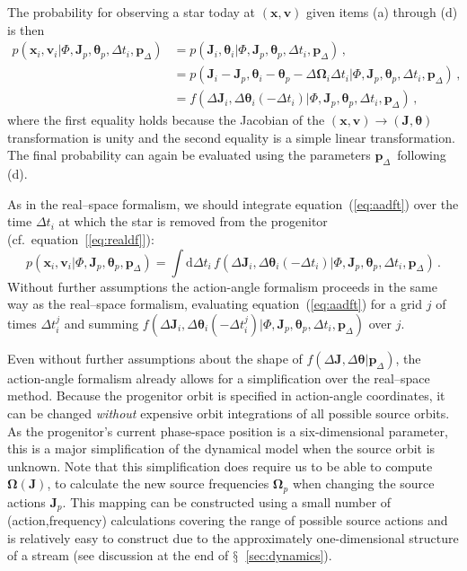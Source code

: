 \documentclass[12pt,preprint]{aastex}
\newcommand{\dd}{\mathrm{d}}
\newcommand{\eqnname}{equation}
\newcommand{\sectionname}{$\mathsection$}
\renewcommand{\vec}[1]{\ensuremath{\mathbf{#1}}}
\newcommand{\vecx}{\ensuremath{\vec{x}}}
\newcommand{\vecv}{\ensuremath{\vec{v}}}
\newcommand{\vecj}{\ensuremath{\vec{J}}}
\newcommand{\veco}{\ensuremath{\vec{\Omega}}}
\newcommand{\veca}{\ensuremath{\boldsymbol\theta}}
\newcommand{\paramsdiff}{\ensuremath{\vec{p}_\Delta}}
\begin{document}
The probability for observing a star today at $(\vecx,\vecv)$ given
items (a) through (d) is then
\begin{align}\label{eq:aadft}
  p(\vecx_i,\vecv_i | \Phi,\vecj_p,\veca_p,\Delta t_i,\paramsdiff) 
  & = p(\vecj_i,\veca_i | \Phi,\vecj_p,\veca_p,\Delta t_i,\paramsdiff) \,,\nonumber\\
  & = p(\vecj_i-\vecj_p,\veca_i-\veca_p-\Delta \veco_i\Delta t_i | \Phi,\vecj_p,\veca_p,\Delta t_i,\paramsdiff) \,,\\
  & = f(\Delta \vecj_i,\Delta \veca_i(-\Delta t_i) | \Phi,\vecj_p,\veca_p,\Delta t_i,\paramsdiff) \,,\nonumber
\end{align}
where the first equality holds because the Jacobian of the
$(\vecx,\vecv)\rightarrow(\vecj,\veca)$ transformation is unity and
the second equality is a simple linear transformation. The final
probability can again be evaluated using the parameters
\paramsdiff\ following (d).

As in the real--space formalism, we should integrate
\eqnname~(\ref{eq:aadft}) over the time $\Delta t_i$ at which the star
is removed from the progenitor (cf.~\eqnname~[\ref{eq:realdf}]):
\begin{equation}\label{eq:aadf}
  p(\vecx_i,\vecv_i | \Phi,\vecj_p,\veca_p,\paramsdiff) = \int \dd
  \Delta t_i\, f(\Delta \vecj_i,\Delta \veca_i(-\Delta t_i) |
  \Phi,\vecj_p,\veca_p,\Delta t_i,\paramsdiff) \,.
\end{equation}
Without further assumptions the action-angle formalism proceeds in the
same way as the real--space formalism, evaluating
\eqnname~(\ref{eq:aadft}) for a grid $j$ of times $\Delta t_i^j$ and
summing $f(\Delta \vecj_i,\Delta \veca_i(-\Delta t^j_i) |
\Phi,\vecj_p,\veca_p,\Delta t_i,\paramsdiff)$ over $j$.

Even without further assumptions about the shape of $f(\Delta
\vecj,\Delta \veca|\paramsdiff)$, the action-angle formalism already
allows for a simplification over the real--space method. Because the
progenitor orbit is specified in action-angle coordinates, it can be
changed \emph{without} expensive orbit integrations of all possible
source orbits. As the progenitor's current phase-space position is a
six-dimensional parameter, this is a major simplification of the
dynamical model when the source orbit is unknown. Note that this
simplification does require us to be able to compute $\veco(\vecj)$,
to calculate the new source frequencies $\veco_p$ when changing the
source actions $\vecj_p$. This mapping can be constructed using a
small number of (action,frequency) calculations covering the range of
possible source actions and is relatively easy to construct due to the
approximately one-dimensional structure of a stream (see discussion at
the end of \sectionname~\ref{sec:dynamics}).
\end{document}
